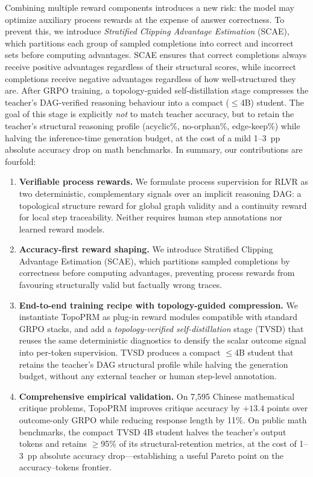 Combining multiple reward components introduces a new risk: the model
may optimize auxiliary process rewards at the expense of answer
correctness. To prevent this, we introduce \emph{Stratified Clipping
Advantage Estimation} (SCAE), which partitions each group of sampled
completions into correct and incorrect sets before computing advantages.
SCAE ensures that correct completions always receive positive advantages
regardless of their structural scores, while incorrect completions
receive negative advantages regardless of how well-structured they are.
After GRPO training, a topology-guided self-distillation stage compresses
the teacher's DAG-verified reasoning behaviour into a compact ($\leq$4B)
student. The goal of this stage is explicitly \emph{not} to match teacher
accuracy, but to retain the teacher's structural reasoning profile
(acyclic\%, no-orphan\%, edge-keep\%) while halving the inference-time
generation budget, at the cost of a mild 1--3~pp absolute accuracy drop
on math benchmarks. In summary, our contributions are fourfold:
\begin{enumerate}[leftmargin=*,itemsep=2pt]
\item \textbf{Verifiable process rewards.} We formulate process supervision for RLVR as two deterministic, complementary signals over an implicit reasoning DAG: a topological structure reward for global graph validity and a continuity reward for local step traceability. Neither requires human step annotations nor learned reward models.

\item \textbf{Accuracy-first reward shaping.} We introduce Stratified Clipping Advantage Estimation (SCAE), which partitions sampled completions by correctness before computing advantages, preventing process rewards from favouring structurally valid but factually wrong traces.

\item \textbf{End-to-end training recipe with topology-guided compression.} We instantiate TopoPRM as plug-in reward modules compatible with standard GRPO stacks, and add a \emph{topology-verified self-distillation} stage (TVSD) that reuses the same deterministic diagnostics to densify the scalar outcome signal into per-token supervision. TVSD produces a compact $\leq$4B student that retains the teacher's DAG structural profile while halving the generation budget, without any external teacher or human step-level annotation.

\item \textbf{Comprehensive empirical validation.} On 7{,}595 Chinese mathematical critique problems, TopoPRM improves critique accuracy by $+13.4$ points over outcome-only GRPO while reducing response length by 11\%. On public math benchmarks, the compact TVSD 4B student halves the teacher's output tokens and retains $\geq$95\% of its structural-retention metrics, at the cost of 1--3~pp absolute accuracy drop---establishing a useful Pareto point on the accuracy--tokens frontier.
\end{enumerate}